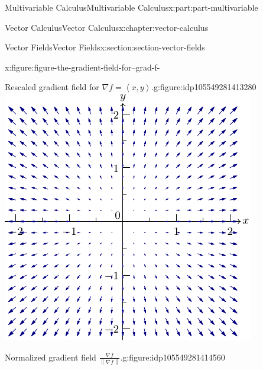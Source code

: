 \documentclass[twoside,10pt,]{book}
\numberwithin{equation}{part}
\newcommand{\grad}{\nabla}
\newcommand{\norm}[1]{\left\| #1 \right\|}
\newcommand{\dotprod}[1]{\left\langle #1 \right\rangle}
\begin{document}
\begin{partptx}{Multivariable Calculus}{}{Multivariable Calculus}{}{}{x:part:part-multivariable}
\begin{chapterptx}{Vector Calculus}{}{Vector Calculus}{}{}{x:chapter:vector-calculus}
\begin{sectionptx}{Vector Fields}{}{Vector Fields}{}{}{x:section:section-vector-fields}
\begin{introduction}{}
\begin{figureptx}{}{x:figure:figure-the-gradient-field-for--grad-f-}{}
\begin{sidebyside}{2}{0}{0}{0}
\begin{sbspanel}{0.5}
\begin{subfigureptx}{Rescaled gradient field for \(\grad f = \dotprod{x,y}\).}{g:figure:idp105549281413280}{}
\includegraphics[width=\linewidth]{generated/asymptote/image-the-gradient-field-for--grad-f-.pdf}
\tcblower
\end{subfigureptx}%
\end{sbspanel}%
\begin{sbspanel}{0.5}%
\begin{subfigureptx}{Normalized gradient field \(\frac{\grad f}{\norm{\grad f}}\).}{g:figure:idp105549281414560}{}%

\end{subfigureptx}
\end{sbspanel}
\end{sidebyside}
\end{figureptx}
\end{introduction}
\end{sectionptx}
\end{chapterptx}
\end{partptx}
\end{document}
